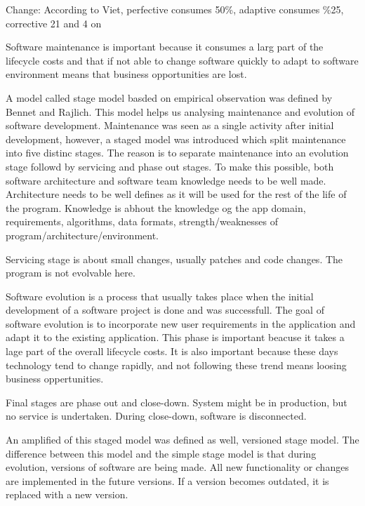 Change: According to Viet, perfective consumes 50\%, adaptive consumes \%25, corrective 21 and 4 on 

Software maintenance is important because it consumes a larg part of the lifecycle costs and that if not able to change software quickly to adapt to software environment means that business opportunities are lost.


A model called stage model basded on empirical observation was defined by Bennet and Rajlich. This model helps us analysing maintenance and evolution of software development. Maintenance was seen as a single activity after initial development, however, a staged model was introduced which split maintenance into five distinc stages. The reason is to separate maintenance into an evolution stage followd by servicing and phase out stages. To make this possible, both software architecture and software team knowledge needs to be well made. Architecture needs to be well defines as it will be used for the rest of the life of the program. Knowledge is abhout the knowledge og the app domain, requirements, algorithms, data formats, strength/weaknesses of program/architecture/environment.

Servicing stage is about small changes, usually patches and code changes. The program is not evolvable here. 

Software evolution is a process that usually takes place when the initial development of a software project is done and was successfull. The goal of software evolution is to incorporate new user requirements in the application and adapt it to the existing application. This phase is important beacuse it takes a lage part of the overall lifecycle costs. It is also important because these days technology tend to change rapidly, and not following these trend means loosing business oppertunities.

Final stages are phase out and close-down. System might be in production, but no service is undertaken. During close-down, software is disconnected. 

An amplified of this staged model was defined as well, versioned stage model. The difference between this model and the simple stage model is that during evolution, versions of software are being made. All new functionality or changes are implemented in the future versions. If a version becomes outdated, it is replaced with a new version.	







